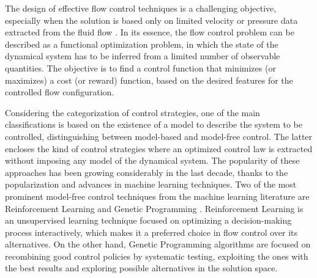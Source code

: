 The design of effective flow control techniques is a challenging objective, especially when the solution is based only on limited velocity or pressure data extracted from the fluid flow \citep{duriez2017book}. In its essence, the flow control problem can be described as a functional optimization problem, in which the state of the dynamical system has to be inferred from a limited number of observable quantities. The objective is to find a control function that minimizes (or maximizes) a cost (or reward) function, based on the desired features for the controlled flow configuration.

Considering the categorization of control strategies, one of the main classifications is based on the existence of a model to describe the system to be controlled, distinguishing between model-based and model-free control. The latter encloses the kind of control strategies where an optimized control law is extracted without imposing any model of the dynamical system. The popularity of these approaches has been growing considerably in the last decade, thanks to the popularization and advances in machine learning techniques. Two of the most prominent model-free control techniques from the machine learning literature are Reinforcement Learning \citep[RL]{sutton2018reinforcement} and Genetic Programming \citep[GP]{koza1994}. Reinforcement Learning is an unsupervised learning technique focused on optimizing a decision-making process interactively, which makes it a preferred choice in flow control over its alternatives. On the other hand, Genetic Programming algorithms are focused on recombining good control policies by systematic testing, exploiting the ones with the best results and exploring possible alternatives in the solution space. 

